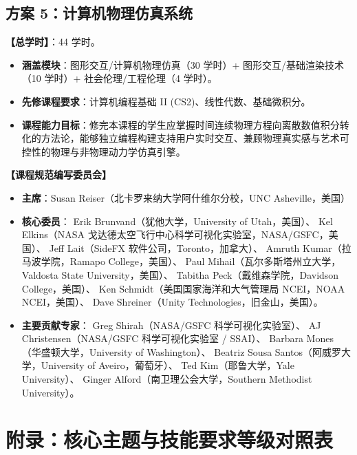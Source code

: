 \subsection{方案 5：计算机物理仿真系统}
\textbf{【总学时】}：44 学时。
\begin{itemize}
    \item \textbf{涵盖模块}：图形交互/计算机物理仿真（30 学时）+ 图形交互/基础渲染技术（10 学时）+ 社会伦理/工程伦理（4 学时）。
    \item \textbf{先修课程要求}：计算机编程基础 II (CS2)、线性代数、基础微积分。
    \item \textbf{课程能力目标}：修完本课程的学生应掌握时间连续物理方程向离散数值积分转化的方法论，能够独立编程构建支持用户实时交互、兼顾物理真实感与艺术可控性的物理与非物理动力学仿真引擎。
\end{itemize}

\vspace{10pt}
\noindent\textbf{【课程规范编写委员会】}
\begin{itemize}
    \item \textbf{主席}：Susan Reiser（北卡罗来纳大学阿什维尔分校，UNC Asheville，美国）
    \item \textbf{核心委员}：
    Erik Brunvand（犹他大学，University of Utah，美国）、
    Kel Elkins（NASA 戈达德太空飞行中心科学可视化实验室，NASA/GSFC，美国）、
    Jeff Lait（SideFX 软件公司，Toronto，加拿大）、
    Amruth Kumar（拉马波学院，Ramapo College，美国）、
    Paul Mihail（瓦尔多斯塔州立大学，Valdosta State University，美国）、
    Tabitha Peck（戴维森学院，Davidson College，美国）、
    Ken Schmidt（美国国家海洋和大气管理局 NCEI，NOAA NCEI，美国）、
    Dave Shreiner（Unity Technologies，旧金山，美国）。
    \item \textbf{主要贡献专家}：
    Greg Shirah（NASA/GSFC 科学可视化实验室）、
    AJ Christensen（NASA/GSFC 科学可视化实验室 / SSAI）、
    Barbara Mones（华盛顿大学，University of Washington）、
    Beatriz Sousa Santos（阿威罗大学，University of Aveiro，葡萄牙）、
    Ted Kim（耶鲁大学，Yale University）、
    Ginger Alford（南卫理公会大学，Southern Methodist University）。
\end{itemize}

\clearpage
\onecolumn
\section{附录：核心主题与技能要求等级对照表}

